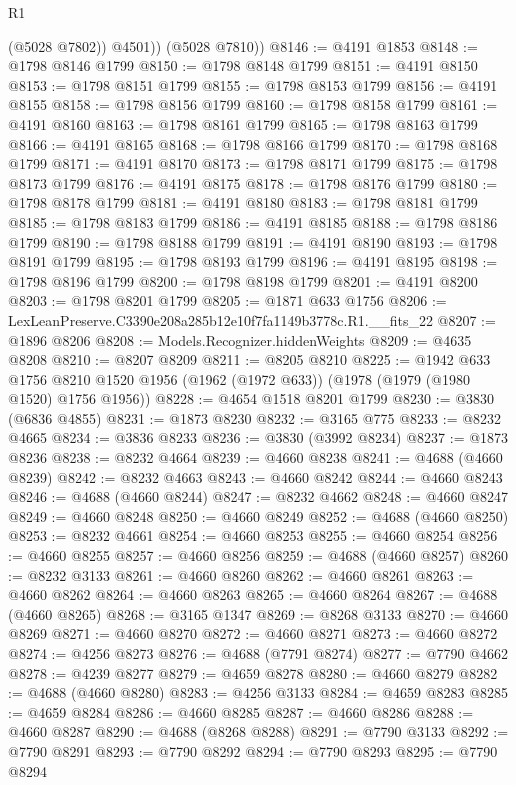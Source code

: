 \begin{lexlean}{R1}
\begin{coremodule}
            (@5028 @7802))
          @4501))
      (@5028 @7810))
@8146 := @4191 @1853
@8148 := @1798 @8146 @1799
@8150 := @1798 @8148 @1799
@8151 := @4191 @8150
@8153 := @1798 @8151 @1799
@8155 := @1798 @8153 @1799
@8156 := @4191 @8155
@8158 := @1798 @8156 @1799
@8160 := @1798 @8158 @1799
@8161 := @4191 @8160
@8163 := @1798 @8161 @1799
@8165 := @1798 @8163 @1799
@8166 := @4191 @8165
@8168 := @1798 @8166 @1799
@8170 := @1798 @8168 @1799
@8171 := @4191 @8170
@8173 := @1798 @8171 @1799
@8175 := @1798 @8173 @1799
@8176 := @4191 @8175
@8178 := @1798 @8176 @1799
@8180 := @1798 @8178 @1799
@8181 := @4191 @8180
@8183 := @1798 @8181 @1799
@8185 := @1798 @8183 @1799
@8186 := @4191 @8185
@8188 := @1798 @8186 @1799
@8190 := @1798 @8188 @1799
@8191 := @4191 @8190
@8193 := @1798 @8191 @1799
@8195 := @1798 @8193 @1799
@8196 := @4191 @8195
@8198 := @1798 @8196 @1799
@8200 := @1798 @8198 @1799
@8201 := @4191 @8200
@8203 := @1798 @8201 @1799
@8205 := @1871 @633 @1756
@8206 := LexLeanPreserve.C3390e208a285b12e10f7fa1149b3778c.R1.__fits_22
@8207 := @1896 @8206
@8208 := Models.Recognizer.hiddenWeights
@8209 := @4635 @8208
@8210 := @8207 @8209
@8211 := @8205 @8210
@8225 := @1942
    @633
    @1756
    @8210
    @1520
    @1956
    (@1962 (@1972 @633))
    (@1978 (@1979 (@1980 @1520) @1756 @1956))
@8228 := @4654 @1518 @8201 @1799
@8230 := @3830 (@6836 @4855)
@8231 := @1873 @8230
@8232 := @3165 @775
@8233 := @8232 @4665
@8234 := @3836 @8233
@8236 := @3830 (@3992 @8234)
@8237 := @1873 @8236
@8238 := @8232 @4664
@8239 := @4660 @8238
@8241 := @4688 (@4660 @8239)
@8242 := @8232 @4663
@8243 := @4660 @8242
@8244 := @4660 @8243
@8246 := @4688 (@4660 @8244)
@8247 := @8232 @4662
@8248 := @4660 @8247
@8249 := @4660 @8248
@8250 := @4660 @8249
@8252 := @4688 (@4660 @8250)
@8253 := @8232 @4661
@8254 := @4660 @8253
@8255 := @4660 @8254
@8256 := @4660 @8255
@8257 := @4660 @8256
@8259 := @4688 (@4660 @8257)
@8260 := @8232 @3133
@8261 := @4660 @8260
@8262 := @4660 @8261
@8263 := @4660 @8262
@8264 := @4660 @8263
@8265 := @4660 @8264
@8267 := @4688 (@4660 @8265)
@8268 := @3165 @1347
@8269 := @8268 @3133
@8270 := @4660 @8269
@8271 := @4660 @8270
@8272 := @4660 @8271
@8273 := @4660 @8272
@8274 := @4256 @8273
@8276 := @4688 (@7791 @8274)
@8277 := @7790 @4662
@8278 := @4239 @8277
@8279 := @4659 @8278
@8280 := @4660 @8279
@8282 := @4688 (@4660 @8280)
@8283 := @4256 @3133
@8284 := @4659 @8283
@8285 := @4659 @8284
@8286 := @4660 @8285
@8287 := @4660 @8286
@8288 := @4660 @8287
@8290 := @4688 (@8268 @8288)
@8291 := @7790 @3133
@8292 := @7790 @8291
@8293 := @7790 @8292
@8294 := @7790 @8293
@8295 := @7790 @8294

\end{coremodule}
\end{lexlean}
